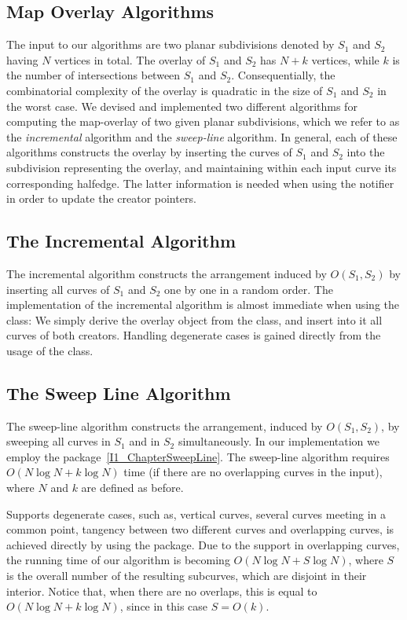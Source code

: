 \begin{ccTexOnly}
\section{Map Overlay Algorithms}
The input to our algorithms are two planar subdivisions denoted by $S_1$ and $S_2$ having 
$N$ vertices in total. The overlay of $S_1$ and $S_2$ has $N+k$ vertices, 
while $k$ is the number of intersections between $S_1$ and $S_2$. 
Consequentially, the combinatorial complexity of the overlay is quadratic 
in the size of $S_1$ and $S_2$ in the worst case.
We devised and implemented two different algorithms for computing the map-overlay 
of two given planar subdivisions, 
which we refer to as the {\it incremental} algorithm and the {\it sweep-line} algorithm. 
In general, each of these algorithms constructs the overlay by inserting 
the curves of $S_1$ and $S_2$ into the subdivision representing the overlay,
and maintaining within each input curve its corresponding halfedge. 
The latter information is needed when using the notifier in order to
update the creator pointers. 

\subsection*{The Incremental Algorithm}
\label{sec:MapOverlayIncremental}
The incremental algorithm constructs the arrangement induced by $O(S_1,S_2)$ 
by inserting all curves of $S_1$ and $S_2$ one by one in a random order. 
The implementation of the incremental algorithm is almost immediate when using 
the  class: We simply derive the overlay object from the 
 class, 
and insert into it all curves of both creators.
Handling degenerate cases is gained directly from the usage of the 
 class.

\subsection*{The Sweep Line Algorithm}
\label{sec:MapOverlaySweepLine}
The sweep-line algorithm constructs the arrangement, induced by $O(S_1,S_2)$, 
by sweeping all curves in $S_1$ and in $S_2$ simultaneously. 
In our implementation we employ the  package~\ref{I1_ChapterSweepLine}. 
The sweep-line algorithm requires $O(N\log{N} + k\log{N})$ time 
(if there are no overlapping curves in the input), 
where $N$ and $k$ are defined as before.

Supports degenerate cases, such as, vertical curves, 
several curves meeting in a common point, tangency between two 
different curves and overlapping curves, 
is achieved directly by using the  package.
Due to the support in overlapping curves, the running time of our algorithm is becoming 
$O(N\log{N} + S\log{N})$, where $S$ is the overall number of the resulting subcurves, which 
are disjoint in their interior. Notice that, when there are no overlaps, this is equal to 
$O(N\log{N} + k\log{N})$, since in this case $S=O(k)$.


\end{ccTexOnly}

